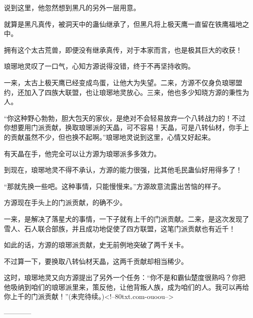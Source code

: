\begin{this_body}
说到这里，他忽然想到黑凡的另外一层用意。

就算是黑凡真传，被洞天中的蛊仙继承了，但黑凡将上极天鹰一直留在铁鹰福地之中。

拥有这个太古荒兽，即便没有继承真传，对于本家而言，也是极其巨大的收获！

琅琊地灵叹了一口气，心知方源说得没错，终于不再坚持收购。

一来，太古上极天鹰已经变成鸟蛋，让他大为失望。二来，方源不仅身负琅琊盟约，还加入了四族大联盟，也让琅琊地灵放心。三来，他也多少知晓方源的秉性为人。

“你这种野心勃勃，胆大包天的家伙，是绝对不会轻易放弃一个八转战力的！不过你想要用门派贡献，换取琅琊派的天晶，可不容易！天晶，可是八转仙材，你手上的贡献虽然不少，但也换不起啊。”琅琊地灵说到这里，心情又好起来。

有天晶在手，他完全可以让方源为琅琊派多多效力。

到现在，琅琊地灵不得不承认，方源的能力很强，比其他毛民蛊仙好用得多了！

“那就先换一些吧。这种事情，只能慢慢来。”方源故意流露出苦恼的样子。

方源现在手头上的门派贡献，的确不少。

一来，是解决了落星犬的事情，一下子就有上千的门派贡献。二来，是这次发现了雪人、石人联合部族，并且成功地促使了四方联盟，这笔门派贡献也有近千！

如此的话，方源的琅琊派贡献，史无前例地突破了两千关卡。

不过算一下，要换取八转仙材天晶，这两千贡献却相当稀少。

这时，琅琊地灵又向方源提出了另外一个任务：“你不是和霸仙楚度很熟吗？你把他吸纳到咱们的琅琊派里来，策反他，让他背叛人族，成为咱们的人。我可以再给你上千的门派贡献！”(未完待续。)<!--80txt.com-ouoou-->

------------

\end{this_body}

